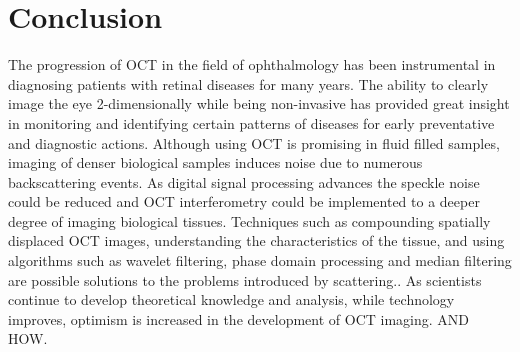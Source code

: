 \documentclass[%
reprint,
showpacs,preprintnumbers,
bibnotes,
amsmath,amssymb,
aps,
pra,
]{revtex4-1}
\begin{document}
	\section{\label{sec:level1} Conclusion}
	The progression of OCT in the field of ophthalmology has been instrumental in diagnosing patients with retinal diseases for many years. The ability to clearly image the eye 2-dimensionally while being non-invasive has provided great insight in monitoring and identifying certain patterns of diseases for early preventative and diagnostic actions. Although using OCT is promising in fluid filled samples, imaging of denser biological samples induces noise due to numerous backscattering events. As digital signal processing advances the speckle noise could be reduced and OCT interferometry could be implemented to a deeper degree of imaging biological tissues. Techniques such as compounding spatially displaced OCT images, understanding the characteristics of the tissue, and using algorithms such as wavelet filtering, phase domain processing and median filtering are possible solutions to the problems introduced by scattering.\cite{Popescu2007}. As scientists continue to develop theoretical knowledge and analysis, while technology improves, optimism is increased in the development of OCT imaging. AND HOW.




	
\end{document}
